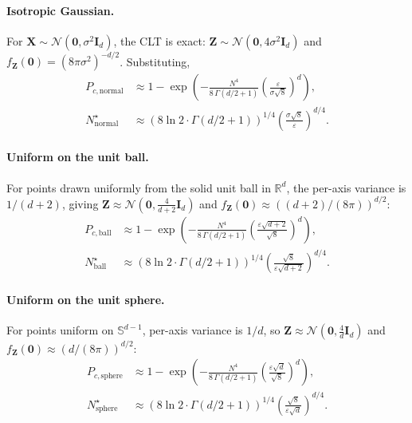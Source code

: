 \documentclass{article}
\newcommand{\vect}[1]{\mathbf{#1}}
\newcommand{\mat}[1]{\mathbf{#1}}
\newcommand{\R}{\mathbb{R}}
\newcommand{\Sph}{\mathbb{S}}
\begin{document}
\paragraph{Isotropic Gaussian.}
For $\vect{X} \sim \mathcal{N}(\vect{0}, \sigma^2 \mat{I}_d)$, the CLT is exact: $\vect{Z} \sim \mathcal{N}(\vect{0}, 4 \sigma^2 \mat{I}_d)$ and $f_{\vect{Z}}(\vect{0}) = (8 \pi \sigma^2)^{-d/2}$. Substituting,
\begin{align}
    P_{c,\mathrm{normal}} &\approx 1 - \exp\!\left( -\frac{N^4}{8 \, \Gamma(d/2 + 1)} \left( \frac{\varepsilon}{\sigma \sqrt{8}} \right)^d \right), \\
    N^\star_{\mathrm{normal}} &\approx \left( 8 \ln 2 \cdot \Gamma(d/2 + 1) \right)^{1/4} \left( \frac{\sigma \sqrt{8}}{\varepsilon} \right)^{d/4}.
\end{align}

\paragraph{Uniform on the unit ball.}
For points drawn uniformly from the solid unit ball in $\R^d$, the per-axis variance is $1/(d+2)$, giving $\vect{Z} \approx \mathcal{N}(\vect{0}, \tfrac{4}{d+2} \mat{I}_d)$ and $f_{\vect{Z}}(\vect{0}) \approx \left((d+2)/(8\pi)\right)^{d/2}$:
\begin{align}
    P_{c,\mathrm{ball}} &\approx 1 - \exp\!\left( -\frac{N^4}{8 \, \Gamma(d/2 + 1)} \left( \frac{\varepsilon \sqrt{d+2}}{\sqrt{8}} \right)^d \right), \\
    N^\star_{\mathrm{ball}} &\approx \left( 8 \ln 2 \cdot \Gamma(d/2 + 1) \right)^{1/4} \left( \frac{\sqrt{8}}{\varepsilon \sqrt{d+2}} \right)^{d/4}.
\end{align}

\paragraph{Uniform on the unit sphere.}
For points uniform on $\Sph^{d-1}$, per-axis variance is $1/d$, so $\vect{Z} \approx \mathcal{N}(\vect{0}, \tfrac{4}{d} \mat{I}_d)$ and $f_{\vect{Z}}(\vect{0}) \approx (d/(8\pi))^{d/2}$:
\begin{align}
    P_{c,\mathrm{sphere}} &\approx 1 - \exp\!\left( -\frac{N^4}{8 \, \Gamma(d/2 + 1)} \left( \frac{\varepsilon \sqrt{d}}{\sqrt{8}} \right)^d \right), \\
    N^\star_{\mathrm{sphere}} &\approx \left( 8 \ln 2 \cdot \Gamma(d/2 + 1) \right)^{1/4} \left( \frac{\sqrt{8}}{\varepsilon \sqrt{d}} \right)^{d/4}.
\end{align}
\end{document}
